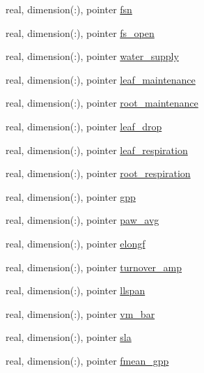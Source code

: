 \begin{DoxyCompactItemize}
real, dimension(\+:), pointer \hyperlink{structed__state__vars_1_1patchtype_a032d58b317bd5dae23dc8301a62d3f8a}{fsn}
\item 
real, dimension(\+:), pointer \hyperlink{structed__state__vars_1_1patchtype_a688c3129c1790fd6b842f7990bb6cf5f}{fs\+\_\+open}
\item 
real, dimension(\+:), pointer \hyperlink{structed__state__vars_1_1patchtype_abb4ee95bd7a2926413df50595faff1a9}{water\+\_\+supply}
\item 
real, dimension(\+:), pointer \hyperlink{structed__state__vars_1_1patchtype_aeba1045779c5ce8f01c136ca0ac6e0bb}{leaf\+\_\+maintenance}
\item 
real, dimension(\+:), pointer \hyperlink{structed__state__vars_1_1patchtype_a8e16a15ff3e8999e070f06cd23799a5e}{root\+\_\+maintenance}
\item 
real, dimension(\+:), pointer \hyperlink{structed__state__vars_1_1patchtype_abe8b69cf13c246f3860b8dbe9bfc908c}{leaf\+\_\+drop}
\item 
real, dimension(\+:), pointer \hyperlink{structed__state__vars_1_1patchtype_a836105f1bc1e794aa45bdf900647e6af}{leaf\+\_\+respiration}
\item 
real, dimension(\+:), pointer \hyperlink{structed__state__vars_1_1patchtype_ab8fa046818f25898e92ac07f09c13b0a}{root\+\_\+respiration}
\item 
real, dimension(\+:), pointer \hyperlink{structed__state__vars_1_1patchtype_a3ce27ca1d0730733fde1c470674bbe33}{gpp}
\item 
real, dimension(\+:), pointer \hyperlink{structed__state__vars_1_1patchtype_a326b6a6ba6287a0b8344e50af8f9dc88}{paw\+\_\+avg}
\item 
real, dimension(\+:), pointer \hyperlink{structed__state__vars_1_1patchtype_aa0984e5ac2952101089327d0c40a4b55}{elongf}
\item 
real, dimension(\+:), pointer \hyperlink{structed__state__vars_1_1patchtype_a47635966b12872d8646c46c8294c0912}{turnover\+\_\+amp}
\item 
real, dimension(\+:), pointer \hyperlink{structed__state__vars_1_1patchtype_ac20303a70275acd9ec3b166b4c3740cd}{llspan}
\item 
real, dimension(\+:), pointer \hyperlink{structed__state__vars_1_1patchtype_a37e219f6314282cae321f40d5637204a}{vm\+\_\+bar}
\item 
real, dimension(\+:), pointer \hyperlink{structed__state__vars_1_1patchtype_ad2bb11cb190087e83ce61352115e8925}{sla}
\item 
real, dimension(\+:), pointer \hyperlink{structed__state__vars_1_1patchtype_ad86a50458e8d6d4df185a6e2df9747d8}{fmean\+\_\+gpp}

\end{DoxyCompactItemize}
